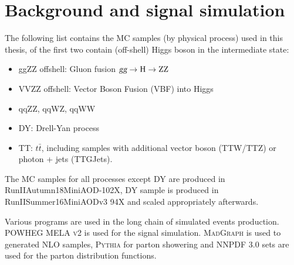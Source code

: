 \section{Background and signal simulation}




The following list contains the MC samples (by physical process) used in this thesis, of the first two
contain (off-shell) Higgs boson in the intermediate state:
\begin{itemize}
\item ggZZ offshell: Gluon fusion $\textsl{g}\textsl{g} \rightarrow\mathrm{H}\rightarrow\mathrm{ZZ}$
\item VVZZ offshell: Vector Boson Fusion (VBF) into Higgs
\item qqZZ, qqWZ, qqWW
\item DY: Drell-Yan process
\item TT: $t\bar{t}$, including samples with additional vector boson (TTW/TTZ) or photon + jets (TTGJets).
\end{itemize}

The MC samples for all processes except DY are produced in RunIIAutumn18MiniAOD-102X,
DY sample is produced in RunIISummer16MiniAODv3 94X and scaled appropriately afterwards.

Various programs are used in the long chain of simulated events production.
\textsc{POWHEG MELA v2}\xspace\cite{powhegv2} is used for the signal simulation.
\textsc{MadGraph}\xspace\cite{madgraph} is used to generated NLO samples, 
\textsc{Pythia}\xspace\cite{pythia} for parton
showering and \textsc{NNPDF} 3.0\cite{nnpdf} sets are used for the parton distribution functions.


